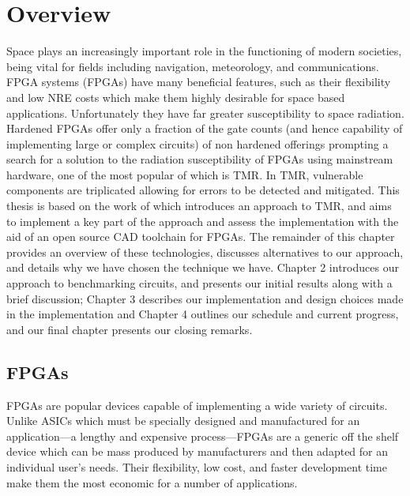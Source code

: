 \documentclass[12pt,final,oneside]{dwThesis} %
\begin{document}
\section{Overview}
Space plays an increasingly important role in the functioning of modern societies, being vital for fields including navigation, meteorology, and communications\cite{OECDSpace}. \acl{FPGA} systems (\acsp{FPGA}) have many beneficial features, such as their flexibility and low \ac{NRE} costs which make them highly desirable for space based applications. Unfortunately they have far greater susceptibility to space radiation. Hardened \acp{FPGA} offer only a fraction of the gate counts (and hence capability of implementing large or complex circuits) of non hardened offerings prompting a search for a solution to the radiation susceptibility of \acp{FPGA} using mainstream hardware\cite{VFPGATMR}, one of the most popular of which is \ac{TMR}. In \ac{TMR}, vulnerable components are triplicated allowing for errors to be detected and mitigated. This thesis is based on the work of\cite{DiesselChange} which introduces an approach to \ac{TMR}, and aims to implement a key part of the approach and assess the implementation with the aid of an open source \ac{CAD} toolchain for \acp{FPGA}.
The remainder of this chapter provides an overview of these technologies, discusses alternatives to our approach, and details why we have chosen the technique we have. Chapter 2 introduces our approach to benchmarking circuits, and presents our initial results along with a brief discussion; Chapter 3 describes our implementation and design choices made in the implementation and Chapter 4 outlines our schedule and current progress, and our final chapter presents our closing remarks.
\acresetall
{}
\subsection{\acsp{FPGA}}
\acp{FPGA} are popular devices capable of implementing a wide variety of circuits. Unlike \acp{ASIC} which must be specially designed and manufactured for an application---a lengthy and expensive process---\acp{FPGA} are a generic off the shelf device which can be mass produced by manufacturers and then adapted for an individual user's needs. Their flexibility, low cost, and faster development time make them the most economic for a number of applications.
\end{document}
